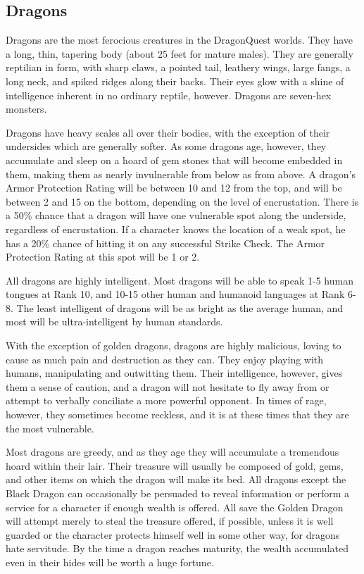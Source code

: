 \begin{multicols*}{2}

\setlength\columnseprule{0.2mm}

\section{Dragons}
Dragons are the most ferocious creatures in the DragonQuest worlds.
They have a long, thin, tapering body (about 25 feet for mature
males).  They are generally reptilian in form, with sharp claws, a
pointed tail, leathery wings, large fangs, a long neck, and spiked
ridges along their backs. Their eyes glow with a shine of intelligence
inherent in no ordinary reptile, however.  Dragons are seven-hex
monsters.

Dragons have heavy scales all over their bodies, with the exception of
their undersides which are generally softer.  As some dragons age,
however, they accumulate and sleep on a hoard of gem stones that will
become embedded in them, making them as nearly invulnerable from below
as from above.  A dragon's Armor Protection Rating will be between 10
and 12 from the top, and will be between 2 and 15 on the bottom,
depending on the level of encrustation. There is a 50\% chance that a
dragon will have one vulnerable spot along the underside, regardless
of encrustation.  If a character knows the location of a weak spot, he
has a 20\% chance of hitting it on any successful Strike Check.  The
Armor Protection Rating at this spot will be 1 or 2.

All dragons are highly intelligent. Most dragons will be able to speak
1-5 human tongues at Rank 10, and 10-15 other human and humanoid
languages at Rank 6-8.  The least intelligent of dragons will be as
bright as the average human, and most will be ultra-intelligent by
human standards.

With the exception of golden dragons, dragons are highly malicious,
loving to cause as much pain and destruction as they can.  They enjoy
playing with humans, manipulating and outwitting them. Their
intelligence, however, gives them a sense of caution, and a dragon
will not hesitate to fly away from or attempt to verbally conciliate a
more powerful opponent.  In times of rage, however, they sometimes
become reckless, and it is at these times that they are the most
vulnerable.

Most dragons are greedy, and as they age they will accumulate a
tremendous hoard within their lair. Their treasure will usually be
composed of gold, gems, and other items on which the dragon will make
its bed. All dragons except the Black Dragon can occasionally be
persuaded to reveal information or perform a service for a character
if enough wealth is offered.  All save the Golden Dragon will attempt
merely to steal the treasure offered, if possible, unless it is well
guarded or the character protects himself well in some other way, for
dragons hate servitude.  By the time a dragon reaches maturity, the
wealth accumulated even in their hides will be worth a huge fortune.


\end{multicols*}
